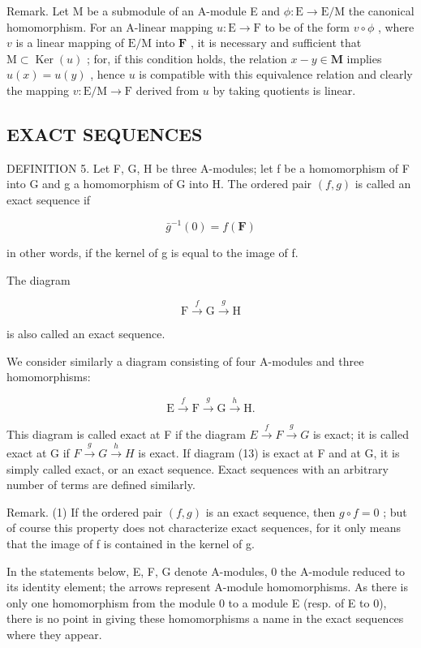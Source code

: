 Remark. Let M be a submodule of an A-module E and \(\phi: \mathrm{E} \to \mathrm{E} / \mathrm{M}\) the canonical homomorphism. For an A-linear mapping \(u: \mathrm{E} \to \mathrm{F}\) to be of the form \(v \circ \phi\) , where \(v\) is a linear mapping of \(\mathrm{E} / \mathrm{M}\) into \(\mathbf{F}\) , it is necessary and sufficient that \(\mathrm{M} \subset \operatorname{Ker}(u)\) ; for, if this condition holds, the relation \(x - y \in \mathbf{M}\) implies \(u(x) = u(y)\) , hence \(u\) is compatible with this equivalence relation and clearly the mapping \(v: \mathrm{E} / \mathrm{M} \to \mathrm{F}\) derived from \(u\) by taking quotients is linear.

\subsection{EXACT SEQUENCES}

DEFINITION 5. Let F, G, H be three A-modules; let f be a homomorphism of F into G and g a homomorphism of G into H. The ordered pair \((f, g)\) is called an exact sequence if

\[
\bar {g} ^ {- 1} (0) = f (\mathbf {F})
\]

in other words, if the kernel of g is equal to the image of f.

The diagram

\[
\mathrm{F} \xrightarrow {f} \mathrm{G} \xrightarrow {g} \mathrm{H}\tag{12}
\]

is also called an exact sequence.

We consider similarly a diagram consisting of four A-modules and three homomorphisms:

\[
\mathrm{E} \xrightarrow {f} \mathrm{F} \xrightarrow {g} \mathrm{G} \xrightarrow {h} \mathrm{H}.\tag{13}
\]

This diagram is called exact at F if the diagram \(E \xrightarrow{f} F \xrightarrow{g} G\) is exact; it is called exact at G if \(F \xrightarrow{g} G \xrightarrow{h} H\) is exact. If diagram (13) is exact at F and at G, it is simply called exact, or an exact sequence. Exact sequences with an arbitrary number of terms are defined similarly.

Remark. (1) If the ordered pair \((f, g)\) is an exact sequence, then \(g \circ f = 0\) ; but of course this property does not characterize exact sequences, for it only means that the image of f is contained in the kernel of g.

In the statements below, E, F, G denote A-modules, 0 the A-module reduced to its identity element; the arrows represent A-module homomorphisms. As there is only one homomorphism from the module 0 to a module E (resp. of E to 0), there is no point in giving these homomorphisms a name in the exact sequences where they appear.

